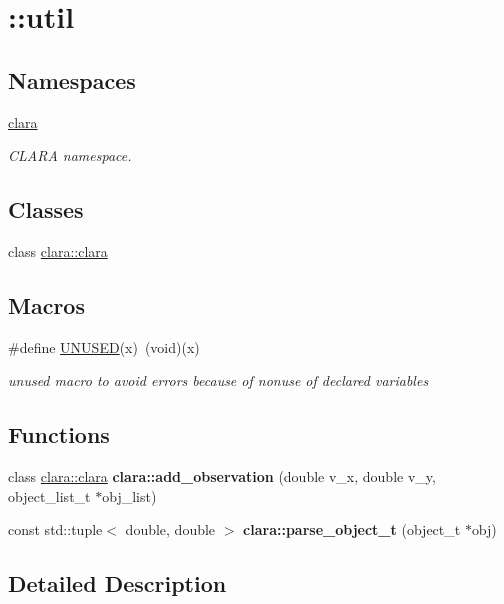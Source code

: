 \hypertarget{group__clara}{}\section{\+:\+:util}
\label{group__clara}
\subsection*{Namespaces}
\begin{DoxyCompactItemize}
\item 
 \hyperlink{namespaceclara}{clara}
\begin{DoxyCompactList}\small\item\em C\+L\+A\+RA namespace. \end{DoxyCompactList}\end{DoxyCompactItemize}
\subsection*{Classes}
\begin{DoxyCompactItemize}
\item 
class \hyperlink{classclara_1_1clara}{clara\+::clara}
\end{DoxyCompactItemize}
\subsection*{Macros}
\begin{DoxyCompactItemize}
\item 
\mbox{\label{group__clara_ga86d500a34c624c2cae56bc25a31b12f3}} 
\#define \hyperlink{group__clara_ga86d500a34c624c2cae56bc25a31b12f3}{U\+N\+U\+S\+ED}(x)~(void)(x)
\begin{DoxyCompactList}\small\item\em unused macro to avoid errors because of nonuse of declared variables \end{DoxyCompactList}\end{DoxyCompactItemize}
\subsection*{Functions}
\begin{DoxyCompactItemize}
\item 
\mbox{\label{group__clara_ga8237cb329f19e297a958ca59b1a6c167}} 
class \hyperlink{classclara_1_1clara}{clara\+::clara} {\bfseries clara\+::add\+\_\+observation} (double v\+\_\+x, double v\+\_\+y, object\+\_\+list\+\_\+t $\ast$obj\+\_\+list)
\item 
\mbox{\label{group__clara_ga1f5ca21e01d7f360d7142a346ba8077a}} 
const std\+::tuple$<$ double, double $>$ {\bfseries clara\+::parse\+\_\+object\+\_\+t} (object\+\_\+t $\ast$obj)
\end{DoxyCompactItemize}


\subsection{Detailed Description}
